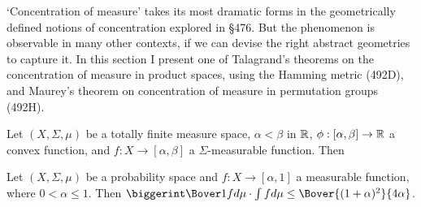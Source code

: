 
\def\chaptername{Further topics}
\def\sectionname{Combinatorial concentration of measure}


`Concentration of measure' takes its most dramatic forms in the
geometrically defined notions of concentration explored in \S476.   But the phenomenon is observable in many other contexts, if
we can devise the right abstract geometries to capture it.   In this
section I present one of Talagrand's theorems on the concentration of
measure in product spaces, using the Hamming metric (492D), and Maurey's
theorem on concentration of measure in permutation groups (492H).

 Let $(X,\Sigma,\mu)$ be a totally finite measure
space, $\alpha<\beta$ in $\Bbb R$, $\phi:[\alpha,\beta]\to\Bbb R$ a
convex function, and $f:X\to[\alpha,\beta]$ a $\Sigma$-measurable
function.   Then



 Let $(X,\Sigma,\mu)$ be a probability space
and $f:X\to[\alpha,1]$ a measurable function, where $0<\alpha\le 1$.
Then $\biggerint\Bover1fd\mu\cdot\int fd\mu\le\Bover{(1+\alpha)^2}{4\alpha}$.


